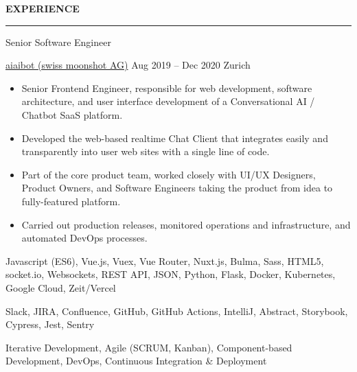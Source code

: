 \documentclass[11pt, a4paper, ragged2e, withhyper]{altacv}
\renewcommand{\cvsectionfont}{\Large\sffamily\bfseries}
\renewcommand{\cvevent}[4]{%
  {\Large\color{emphasis}#1\par}
  \medskip\normalsize
  \ifstrequal{#2}{}{}{
  	{#2}}
  \ifstrequal{#3}{}{}{{
  	\hspace{0.5em}
  	{#3}}}
  \ifstrequal{#4}{}{}{{
  	\hspace{0.5em}
  	{#4}}}\par
  \medskip\normalsize
}
\renewcommand{\cvsection}[2][]{%
  \bigskip%
  \ifstrequal{#1}{}{}{\marginpar{\vspace*{\dimexpr1pt-\baselineskip}\raggedright}}%
  {\color{heading}\cvsectionfont\MakeUppercase{#2}}\\%
  {\color{headingrule}\rule{\linewidth}{0.5pt}\par}\bigskip
}
\begin{document}
	
\pagestyle{default}
\makecvheader

\setlength{\columnsep}{30pt}

\begin{paracol}{2}


	\cvsection{Experience}
	
	\cvevent{Senior Software Engineer}{\href{https://www.aiaibot.com/}{aiaibot (swiss moonshot AG)}}{Aug 2019 -- Dec 2020}{Zurich}

	\bigskip
	\begin{itemize}[label=\color{bullet}\textbullet]
		\item Senior Frontend Engineer, responsible for web development, software architecture, and user interface development of a Conversational AI / Chatbot SaaS platform.
		\item Developed the web-based realtime Chat Client that integrates easily and transparently into user web sites with a single line of code.
		\item Part of the core product team, worked closely with UI/UX Designers, Product Owners, and Software Engineers taking the product from idea to fully-featured platform.
		\item Carried out production releases, monitored operations and infrastructure, and automated DevOps processes.
	\end{itemize}

	\bigskip
	\begin{description}
		\small
		\item [Technologies:] Javascript (ES6), Vue.js, Vuex, Vue Router, Nuxt.js, Bulma, Sass, HTML5, socket.io, Websockets, REST API, JSON, Python, Flask, Docker, Kubernetes, Google Cloud, Zeit/Vercel\smallskip
		\item [Tools:] Slack, JIRA, Confluence, GitHub, GitHub Actions, IntelliJ, Abstract, Storybook, Cypress, Jest, Sentry\smallskip
		\item [Methodologies:] Iterative Development, Agile (SCRUM, Kanban), Component-based Development, DevOps, Continuous Integration \& Deployment
	\end{description}


\end{paracol}
\end{document}
